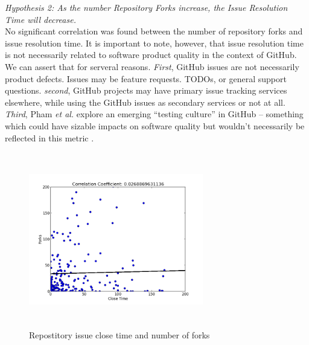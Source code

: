 \documentclass{proc}
\begin{document}
\emph{Hypothesis 2: As the number Repository Forks increase, the Issue Resolution Time will decrease.}\\
No significant correlation was found between the number of repository forks and issue resolution time. It is important to note, however, that issue resolution time is not necessarily related to software product quality in the context of GitHub. We can assert that for serveral reasons. \textit{First}, GitHub issues are not necessarily product defects. Issues may be feature requests. TODOs, or general support questions. \textit{second}, GitHub projects may have primary issue tracking services elsewhere, while using the GitHub issues as secondary services or not at all. \textit{Third}, Pham \textit{et al.} explore an emerging ``testing culture'' in GitHub -- something which could have sizable impacts on software quality but wouldn't necessarily be reflected in this metric \cite{phamcreating}.
\begin{figure}
\includegraphics[height=3in,width=3in]{images/issue_close_time_forks_scatterplot.png}
\caption{Repostitory issue close time and number of forks}
\end{figure}
\end{document}
